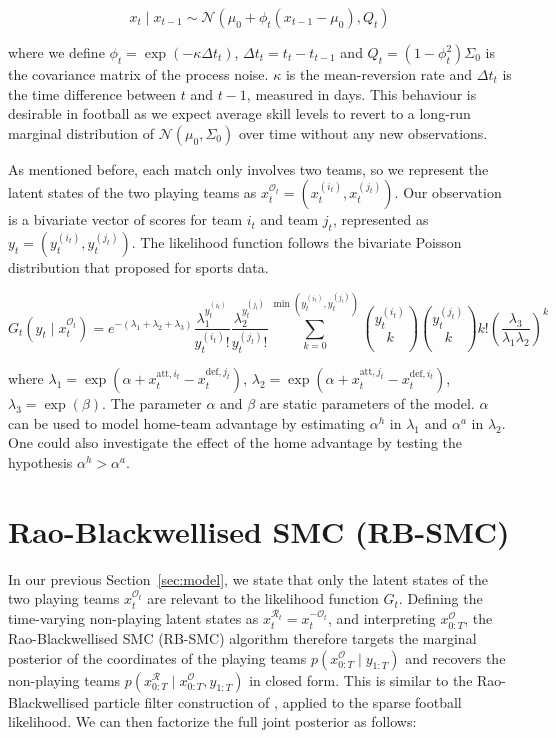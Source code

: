 \begin{equation}
    x_t \mid x_{t-1} \sim \mathcal{N}(\mu_0 + \phi_t (x_{t-1} - \mu_0), Q_t)
\end{equation}

where we define $\phi_t = \exp(-\kappa \Delta t_t)$, $\Delta t_t = t_t - t_{t-1}$ and $Q_t = (1 - \phi_t^2)\Sigma_0$ is the covariance matrix of the process noise. $\kappa$ is the mean-reversion rate and $\Delta t_t$ is the time difference between $t$ and $t-1$, measured in days. This behaviour is desirable in football as we expect average skill levels to revert to a long-run marginal distribution of $\mathcal{N}(\mu_0, \Sigma_0)$ over time without any new observations.

As mentioned before, each match only involves two teams, so we represent the latent states of the two playing teams as $x_t^{\mathcal{O}_t} = (x_t^{(i_t)}, x_t^{(j_t)})$. Our observation is a bivariate vector of scores for team $i_t$ and team $j_t$, represented as $y_t = (y_t^{(i_t)}, y_t^{(j_t)})$. The likelihood function follows the bivariate Poisson distribution that \citet{karlisntzoufras2003bivariatepoisson} proposed for sports data.

\begin{equation}
\label{eq:likelihood}
    G_t(y_t \mid x_t^{\mathcal{O}_t}) = e^{-(\lambda_1 + \lambda_2 + \lambda_3)} \frac{\lambda_1^{y_t^{(i_t)}}}{y_t^{(i_t)}!} \frac{\lambda_2^{y_t^{(j_t)}}}{y_t^{(j_t)}!} \sum_{k=0}^{\min(y_t^{(i_t)}, y_t^{(j_t)})} \binom{y_t^{(i_t)}}{k} \binom{y_t^{(j_t)}}{k} k! \left( \frac{\lambda_{3}}{\lambda_1 \lambda_2} \right)^k
\end{equation}

where $\lambda_1 = \exp(\alpha + x_t^{\text{att}, i_t} - x_t^{\text{def}, j_t})$, $\lambda_2 = \exp(\alpha + x_t^{\text{att}, j_t} - x_t^{\text{def}, i_t})$, $\lambda_3 = \exp(\beta)$. The parameter $\alpha$ and $\beta$ are static parameters of the model. $\alpha$ can be used to model home-team advantage by estimating $\alpha^h$ in $\lambda_1$ and $\alpha^a$ in $\lambda_2$. One could also investigate the effect of the home advantage by testing the hypothesis $\alpha^h > \alpha^a$.

\section{Rao-Blackwellised SMC (RB-SMC)}
\label{sec:rb-smc}
In our previous Section~\ref{sec:model}, we state that only the latent states of the two playing teams $x_t^{\mathcal{O}_t}$ are relevant to the likelihood function $G_t$. Defining the time-varying non-playing latent states as $x_t^{\mathcal{R}_t} = x_t^{-\mathcal{O}_t}$, and interpreting $x_{0:T}^{\mathcal{O}}$, the Rao-Blackwellised SMC (RB-SMC) algorithm therefore targets the marginal posterior of the coordinates of the playing teams $p(x_{0:T}^{\mathcal{O}} \mid y_{1:T})$ and recovers the non-playing teams $p(x_{0:T}^{\mathcal{R}} \mid x_{0:T}^{\mathcal{O}}, y_{1:T})$ in closed form. This is similar to the Rao-Blackwellised particle filter construction of \citet{doucetdefreitasmurphyrussell2000rbpf}, applied to the sparse football likelihood. We can then factorize the full joint posterior as follows:

